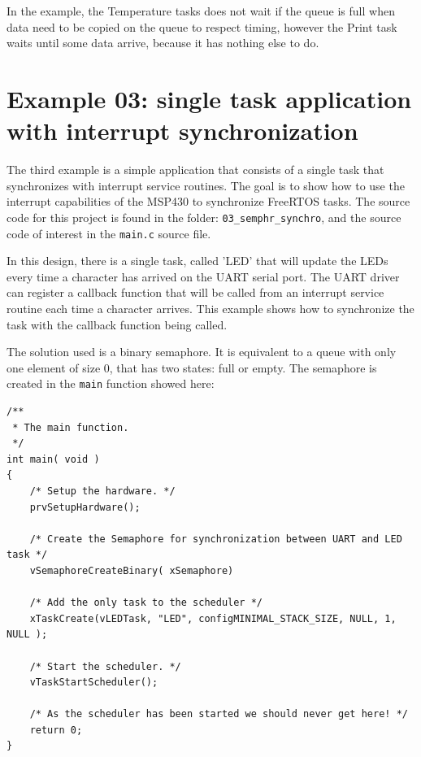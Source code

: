 \documentclass[11pt]{report}
\begin{document}
In the example, the Temperature tasks does not wait if the queue is full when data need to be copied on the queue to respect timing, however the Print task waits until some data arrive, because it has nothing else to do.

\section{Example 03: single task application with interrupt synchronization}

The third example is a simple application that consists of a single task that synchronizes with interrupt service routines. The goal is to show how to use the interrupt capabilities of the MSP430 to synchronize FreeRTOS tasks. The source code for this project is found in the folder: \verb$03_semphr_synchro$, and the source code of interest in the \verb$main.c$ source file.

In this design, there is a single task, called 'LED' that will update the LEDs every time a character has arrived on the UART serial port. The UART driver can register a callback function that will be called from an interrupt service routine each time a character arrives. This example shows how to synchronize the task with the callback function being called.

The solution used is a binary semaphore. It is equivalent to a queue with only one element of size 0, that has two states: full or empty. The semaphore is created in the \verb$main$ function showed here:
\begin{verbatim}
/**
 * The main function.
 */
int main( void )
{
    /* Setup the hardware. */
    prvSetupHardware();

    /* Create the Semaphore for synchronization between UART and LED task */
    vSemaphoreCreateBinary( xSemaphore)

    /* Add the only task to the scheduler */
    xTaskCreate(vLEDTask, "LED", configMINIMAL_STACK_SIZE, NULL, 1, NULL );

    /* Start the scheduler. */
    vTaskStartScheduler();

    /* As the scheduler has been started we should never get here! */
    return 0;
}
\end{verbatim}
\end{document}
